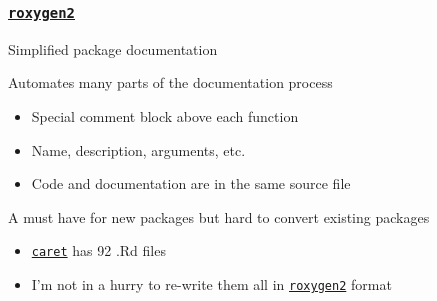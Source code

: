 \documentclass[12 pt]{beamer}\usepackage[]{graphicx}\usepackage[]{color}
\newcommand{\pkg}[1]{{\fontseries{b}\selectfont #1}}
\renewcommand{\pkg}[1]{{\color{darkgreen}\texttt{#1}}}
\begin{document}
  \begin{frame}[fragile]
\frametitle{\href{http://cran.r-project.org/web/packages/roxygen2/index.html}{\pkg{roxygen2}}}

Simplified package documentation

\vspace{.2in}

Automates many parts of the documentation process
\begin{itemize}
\item  Special comment block above each function
\item Name, description, arguments, etc.
\item Code and documentation are in the same source file
\end{itemize}

\vspace{.2in}

A must have for new packages but hard to convert existing packages
\begin{itemize}
\item   \href{http://cran.r-project.org/web/packages/caret/index.html}{\pkg{caret}} has 92 .Rd files
\item I'm not in a hurry to re-write them all in \href{http://cran.r-project.org/web/packages/roxygen2/index.html}{\pkg{roxygen2}} format
\end{itemize}




\end{frame}
\end{document}
